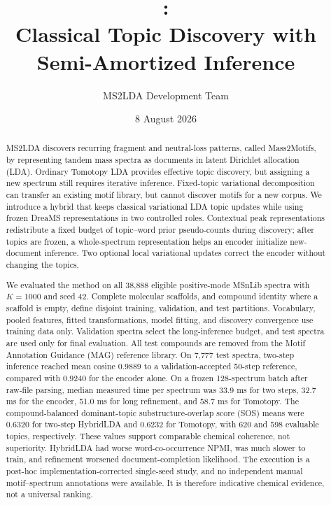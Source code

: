 \documentclass[11pt]{article}
\title{\method:\\
Classical Topic Discovery with Semi-Amortized Inference}
\author{MS2LDA Development Team}
\date{8 August 2026}
\begin{document}
\maketitle

\begin{abstract}
MS2LDA discovers recurring fragment and neutral-loss patterns, called
Mass2Motifs, by representing tandem mass spectra as documents in latent
Dirichlet allocation (LDA). Ordinary Tomotopy LDA provides effective topic
discovery, but assigning a new spectrum still requires iterative inference.
Fixed-topic variational decomposition can transfer an existing motif library,
but cannot discover motifs for a new corpus. We introduce a hybrid that keeps
classical variational LDA topic updates while using frozen DreaMS
representations in two controlled roles. Contextual peak representations
redistribute a fixed budget of topic--word prior pseudo-counts during
discovery; after topics are frozen, a whole-spectrum representation helps an
encoder initialize new-document inference. Two optional local variational
updates correct the encoder without changing the topics.

We evaluated the method on all 38,888 eligible positive-mode MSnLib spectra
with $K=1000$ and seed 42. Complete molecular scaffolds, and compound identity
where a scaffold is empty, define disjoint training, validation, and test
partitions. Vocabulary, pooled features, fitted transformations, model fitting,
and discovery convergence use training data only. Validation spectra select
the long-inference budget, and test spectra are used only for final evaluation.
All test compounds are removed from the Motif Annotation Guidance (MAG)
reference library. On 7,777 test spectra,
two-step inference reached mean
cosine 0.9889 to a validation-accepted 50-step reference, compared with 0.9240
for the encoder alone. On a frozen 128-spectrum batch after raw-file parsing,
median measured time per spectrum was 33.9 ms for two steps, 32.7 ms for the
encoder, 51.0 ms for long refinement, and 58.7 ms for Tomotopy. The
compound-balanced dominant-topic
substructure-overlap score (SOS) means were 0.6320 for two-step HybridLDA and
0.6232 for Tomotopy, with 620 and 598 evaluable topics, respectively. These
values support comparable chemical
coherence, not superiority. HybridLDA had worse word-co-occurrence NPMI, was
much slower to train, and refinement worsened document-completion likelihood.
The execution is a post-hoc implementation-corrected single-seed study, and no
independent manual motif--spectrum annotations were available. It is therefore
indicative chemical evidence, not a universal ranking.
\end{abstract}
\end{document}
